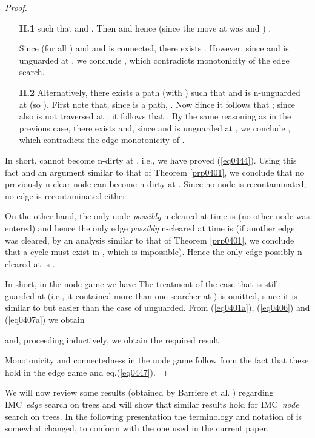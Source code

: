 \documentclass[11pt]{article}\usepackage{amsmath}
\begin{document}
\begin{proof}
\begin{enumerate}
\item[\textbf{II.1}]  such that  and
. Then
 and hence (since the move at  was
 and ) .

Since  (for all ) and
 and
 is connected, there exists . However, since  and  is unguarded at , we conclude , which contradicts monotonicity of the edge search.

\item[\textbf{II.2}] Alternatively, there exists a path  (with ) such that  and  is n-unguarded at
 (so ). First note that,
since  is a path, .
Now
Since  it
follows that ; since also
 is not traversed at , it follows that . By the same reasoning as in the previous case,
there exists  and, since  and  is unguarded at , we conclude
, which contradicts the edge monotonicity
of .
\end{enumerate}

In short,  cannot become n-dirty at , i.e., we have proved
(\ref{eq0444}). Using this fact and an argument similar to that of Theorem
\ref{prp0401}, we conclude that no previously n-clear node can become n-dirty
at . Since no node is recontaminated, no edge is recontaminated either.

On the other hand, the only node \emph{possibly }n-cleared at time  is
 (no other node was entered) and hence the only edge \emph{possibly
}n-cleared at time  is  (if another edge was cleared, by an analysis
similar to that of Theorem \ref{prp0401}, we conclude that a cycle must exist
in , which is impossible). Hence the only edge possibly n-cleared
at  is .

In short, in the node game we have
The treatment of the case that  is still guarded at  (i.e., it
contained more than one searcher at ) is omitted, since it is similar to
but easier than the case of  unguarded. \medskip From \noindent
(\ref{eq0401a}), (\ref{eq0406}) and (\ref{eq0407a}) we obtain

and, proceeding inductively, we obtain the required result

Monotonicity and connectedness in the node game follow from the fact that
these hold in the edge game and eq.(\ref{eq0447}).
\end{proof}

We will now review some results (obtained by Barriere et al.
\cite{Barriere1,Barriere2}) regarding IMC\ \emph{edge }search on trees and
will show that similar results hold for IMC\ \emph{node }search on trees. In
the following presentation the terminology and notation of
\cite{Barriere1,Barriere2} is somewhat changed, to conform with the one used
in the current paper.
\end{document}
